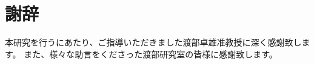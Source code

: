 \documentclass[12pt,dvipdfmx]{jreport}
\begin{document}
\maketitle
\tableofcontents










\chapter*{謝辞}
本研究を行うにあたり、ご指導いただきました渡部卓雄准教授に深く感謝致します。
また、様々な助言をくださった渡部研究室の皆様に感謝致します。



\end{document}
